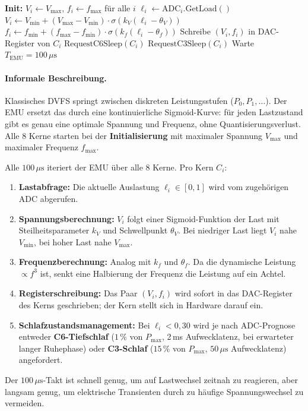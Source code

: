 ﻿\documentclass[a4paper,12pt]{scrreprt}
\theoremstyle{definition}
\begin{document}
	\begin{algorithm}[H]
		\caption{Energy Management Unit (EMU) -- Kontinuierliches DVFS}
		\label{alg:emu}
		\begin{algorithmic}[1]
			\State \textbf{Init:} $V_i \gets V_{\max}$, $f_i \gets f_{\max}$ für alle $i$
			\Repeat
			\State $\ell_i \gets \mathrm{ADC}_i.\mathrm{GetLoad}()$
			\State $V_i \gets V_{\min} + (V_{\max}-V_{\min}) \cdot \sigma(k_V(\ell_i - \theta_V))$
			\State $f_i \gets f_{\min} + (f_{\max}-f_{\min}) \cdot \sigma(k_f(\ell_i - \theta_f))$
			\State Schreibe $(V_i, f_i)$ in DAC-Register von $C_i$
			\State $\mathrm{RequestC6Sleep}(C_i)$
			\State $\mathrm{RequestC3Sleep}(C_i)$
			\EndIf
			\EndFor
			\State Warte $T_{\mathrm{EMU}} = 100\,\mu\mathrm{s}$
		\end{algorithmic}
	\end{algorithm}

	\paragraph{Informale Beschreibung.}
	Klassisches DVFS springt zwischen diskreten Leistungsstufen ($P_0, P_1, \ldots$).
	Der EMU ersetzt das durch eine kontinuierliche Sigmoid-Kurve: für jeden Lastzustand gibt es genau
	eine optimale Spannung und Frequenz, ohne Quantisierungsverlust.
	Alle 8 Kerne starten bei der \textbf{Initialisierung} mit maximaler Spannung $V_{\max}$ und
	maximaler Frequenz $f_{\max}$.

	Alle $100\,\mu\mathrm{s}$ iteriert der EMU über alle 8 Kerne. Pro Kern $C_i$:
	\begin{enumerate}[noitemsep]
		\item \textbf{Lastabfrage:} Die aktuelle Auslastung $\ell_i \in [0,1]$ wird vom zugehörigen ADC
			abgerufen.
		\item \textbf{Spannungsberechnung:} $V_i$ folgt einer Sigmoid-Funktion der Last mit Steilheitsparameter
			$k_V$ und Schwellpunkt $\theta_V$. Bei niedriger Last liegt $V_i$ nahe $V_{\min}$,
			bei hoher Last nahe $V_{\max}$.
		\item \textbf{Frequenzberechnung:} Analog mit $k_f$ und $\theta_f$. Da die dynamische Leistung
			$\propto f^3$ ist, senkt eine Halbierung der Frequenz die Leistung auf ein Achtel.
		\item \textbf{Registerschreibung:} Das Paar $(V_i, f_i)$ wird sofort in das DAC-Register des Kerns
			geschrieben; der Kern stellt sich in Hardware darauf ein.
		\item \textbf{Schlafzustandsmanagement:} Bei $\ell_i < 0{,}30$ wird je nach ADC-Prognose entweder
			\textbf{C6-Tiefschlaf} ($1\,\%$ von $P_{\max}$, 2\,ms Aufwecklatenz, bei erwarteter langer
			Ruhephase) oder \textbf{C3-Schlaf} ($15\,\%$ von $P_{\max}$, $50\,\mu\mathrm{s}$
			Aufwecklatenz) angefordert.
	\end{enumerate}
	Der $100\,\mu\mathrm{s}$-Takt ist schnell genug, um auf Lastwechsel zeitnah zu reagieren,
	aber langsam genug, um elektrische Transienten durch zu häufige Spannungswechsel zu vermeiden.
\end{document}
